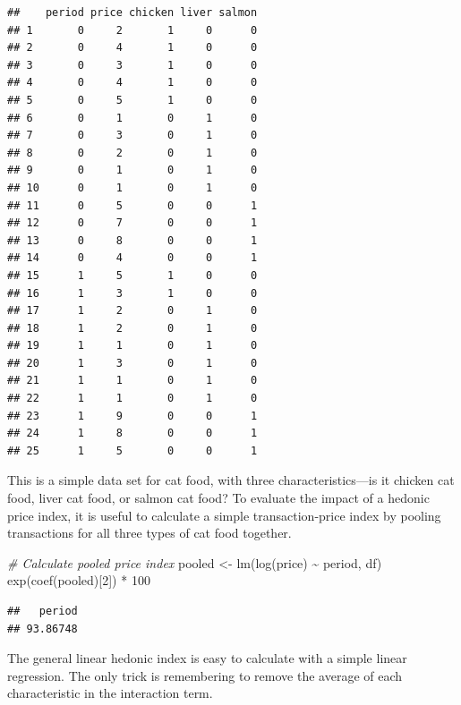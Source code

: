 \documentclass[
]{article}
\newenvironment{Shaded}{\begin{snugshade}}{\end{snugshade}}
\newcommand{\CommentTok}[1]{\textcolor[rgb]{0.56,0.35,0.01}{\textit{#1}}}
\newcommand{\DecValTok}[1]{\textcolor[rgb]{0.00,0.00,0.81}{#1}}
\newcommand{\FunctionTok}[1]{\textcolor[rgb]{0.00,0.00,0.00}{#1}}
\newcommand{\NormalTok}[1]{#1}
\newcommand{\OtherTok}[1]{\textcolor[rgb]{0.56,0.35,0.01}{#1}}
\newcommand{\SpecialCharTok}[1]{\textcolor[rgb]{0.00,0.00,0.00}{#1}}
\begin{document}
\begin{verbatim}
##    period price chicken liver salmon
## 1       0     2       1     0      0
## 2       0     4       1     0      0
## 3       0     3       1     0      0
## 4       0     4       1     0      0
## 5       0     5       1     0      0
## 6       0     1       0     1      0
## 7       0     3       0     1      0
## 8       0     2       0     1      0
## 9       0     1       0     1      0
## 10      0     1       0     1      0
## 11      0     5       0     0      1
## 12      0     7       0     0      1
## 13      0     8       0     0      1
## 14      0     4       0     0      1
## 15      1     5       1     0      0
## 16      1     3       1     0      0
## 17      1     2       0     1      0
## 18      1     2       0     1      0
## 19      1     1       0     1      0
## 20      1     3       0     1      0
## 21      1     1       0     1      0
## 22      1     1       0     1      0
## 23      1     9       0     0      1
## 24      1     8       0     0      1
## 25      1     5       0     0      1
\end{verbatim}

This is a simple data set for cat food, with three characteristics---is it chicken cat food, liver cat food, or salmon cat food? To evaluate the impact of a hedonic price index, it is useful to calculate a simple transaction-price index by pooling transactions for all three types of cat food together.

\begin{Shaded}
\begin{Highlighting}[]
\CommentTok{\# Calculate pooled price index}
\NormalTok{pooled }\OtherTok{\textless{}{-}} \FunctionTok{lm}\NormalTok{(}\FunctionTok{log}\NormalTok{(price) }\SpecialCharTok{\textasciitilde{}}\NormalTok{ period, df)}
\FunctionTok{exp}\NormalTok{(}\FunctionTok{coef}\NormalTok{(pooled)[}\DecValTok{2}\NormalTok{]) }\SpecialCharTok{*} \DecValTok{100}
\end{Highlighting}
\end{Shaded}

\begin{verbatim}
##   period 
## 93.86748
\end{verbatim}

The general linear hedonic index is easy to calculate with a simple linear regression. The only trick is remembering to remove the average of each characteristic in the interaction term.
\end{document}
